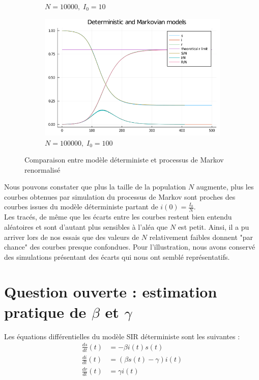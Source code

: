 \documentclass[12pt]{extarticle}
\begin{document}
\begin{figure}[h!]
\begin{subfigure}{.5\textwidth}
        \caption{$N = 10000, \; I_0 = 10$}
    \end{subfigure}
    \begin{subfigure}{.5\textwidth}
        \includegraphics[width=0.8\linewidth]{figures/figureN_100000_initialI_100.png}
        \caption{$N = 100000, \; I_0 = 100$}
    \end{subfigure}
    \caption{Comparaison entre modèle déterministe et processus de Markov renormalisé}
    \label{fig:convergence}
\end{figure}

Nous pouvons constater que plus la taille de la population $N$ augmente, plus les courbes obtenues par simulation du processus de Markov sont proches des courbes issues du modèle déterministe partant de $i(0) = \frac{I_0}{N}$.\\
Les tracés, de même que les écarts entre les courbes restent bien entendu aléatoires et sont d'autant plus sensibles à l'aléa que $N$ est petit.
Ainsi, il a pu arriver lors de nos essais que des valeurs de $N$ relativement faibles donnent "par chance" des courbes presque confondues.
Pour l'illustration, nous avons conservé des simulations présentant des écarts qui nous ont semblé représentatifs.


\section{Question ouverte : estimation pratique de $\beta$ et $\gamma$}

Les équations différentielles du modèle SIR déterministe sont les suivantes : 
\begin{align*}
    \frac{ds}{dt}(t) &= -\beta i(t) s(t)\\
    \frac{di}{dt}(t) &= (\beta s(t) - \gamma) i(t)\\
    \frac{dr}{dt}(t) &= \gamma i(t)
\end{align*}
\end{document}
